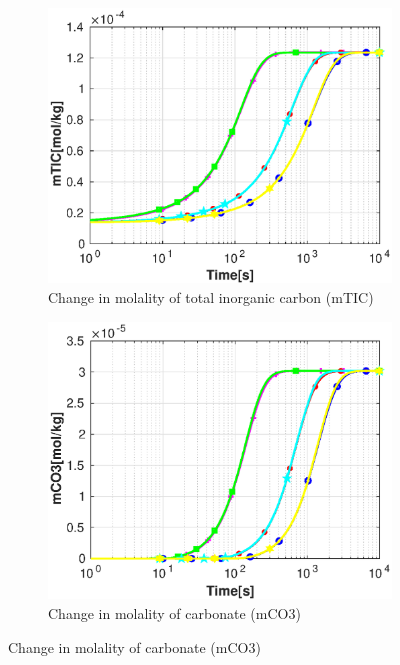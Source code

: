 \begin{figure}[!h]
\begin{subfigure}{.5\linewidth}
    \end{subfigure}%
    \hfill
    \begin{subfigure}{.5\linewidth}
            \centering
        \includegraphics[width=\textwidth]{PICTURES/dvm_pH6_mTIC.eps}
        \caption{\small Change in molality of total inorganic carbon (mTIC)}
        \label{fig:dvmpH6mTIC}
    \end{subfigure}%
    \hfill
    \begin{subfigure}{.5\linewidth}
            \centering
        \includegraphics[width=\textwidth]{PICTURES/dvm_pH6_mCO3.eps}
        \caption{\small Change in molality of carbonate (mCO3)}

\end{subfigure}
\end{figure}
